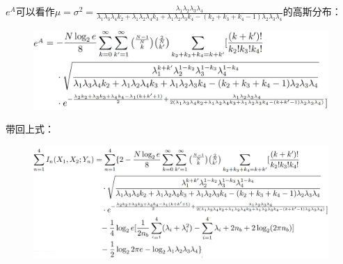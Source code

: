 \documentclass[12pt]{article}
\begin{document}
$e^A$可以看作$\mu=\sigma^2=\frac{\lambda_1\lambda_2\lambda_3\lambda_4}{\lambda_1\lambda_3\lambda_4k_2+\lambda_1\lambda_2\lambda_4k_3+\lambda_1\lambda_2\lambda_3k_4-(k_2+k_3+k_4-1)\lambda_2\lambda_3\lambda_4}$的高斯分布：\par
\begin{figure}[htpb]
    \centering
    \includegraphics[width=15.4cm]{11.png}
\end{figure}
带回上式：\par
\begin{figure}[htpb]
    \centering
    \includegraphics[width=16.5cm]{12.png}
\end{figure}

\newpage
\end{document}
